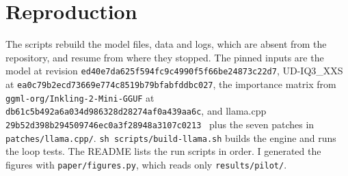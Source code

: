 \documentclass[11pt,a4paper]{article}
\newcommand{\code}[1]{\texttt{#1}}
\begin{document}
\section*{Reproduction}

The scripts rebuild the model files, data and logs, which are absent from the repository, and resume from where they stopped. The pinned inputs are the model at revision \nolinkurl{ed40e7da625f594fc9c4990f5f66be24873c22d7}, UD-IQ3\_XXS at \nolinkurl{ea0c79b2ecd73669e774c8519b79bfabfddbc027}, the importance matrix from \code{ggml-org/Inkling-2-Mini-GGUF} at \nolinkurl{db61c5b492a6a034d986328d28274af0a439aa6c}, and llama.cpp \nolinkurl{29b52d398b294509746ec0a3f28948a3107c0213}~\citep{llamacpp} plus the seven patches in \code{patches/llama.cpp/}. \code{sh scripts/build-llama.sh} builds the engine and runs the loop tests. The README lists the run scripts in order. I generated the figures with \code{paper/figures.py}, which reads only \code{results/pilot/}.



\end{document}
